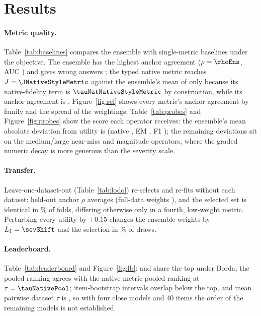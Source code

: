 \documentclass[10pt,twocolumn]{article}
\begin{document}
\section{Results}\label{sec:results}
\paragraph{Metric quality.} Table~\ref{tab:baselines} compares the ensemble with single-metric baselines under the objective. The ensemble has the highest anchor agreement ($\rho=\rhoEns$, AUC \aucEns) and gives wrong answers \badEns{}; the typed native metric reaches $J=\JNativeStyleMetric$ against the ensemble's mean of \JEnsembleTopHundred{} only because its native-fidelity term is $\tauNatNativeStyleMetric$ by construction, while its anchor agreement is \rhoNativeStyleMetric{}. Figure~\ref{fig:sel} shows every metric's anchor agreement by family and the spread of the \topK{} weightings; Table~\ref{tab:probes} and Figure~\ref{fig:probes} show the score each operator receives: the ensemble's mean absolute deviation from utility is \probeMaeEns{} (native \probeMaeNative, EM \probeMaeEm, F1 \probeMaeF); the remaining deviations sit on the medium/large near-miss and magnitude operators, where the graded numeric decay is more generous than the severity scale.
\paragraph{Transfer.} Leave-one-dataset-out (Table~\ref{tab:lodo}) re-selects and re-fits without each dataset: held-out anchor $\rho$ averages \lodoMeanLodo{} (full-data weights \lodoMeanFull), and the selected set is identical in \lodoSameSel\% of folds, differing otherwise only in a fourth, low-weight metric. Perturbing every utility by $\pm0.15$ changes the ensemble weights by $L_1=\sevShift$ and the selection in \sevSelChanged\% of draws.
\paragraph{Leaderboard.} Table~\ref{tab:leaderboard} and Figure~\ref{fig:lb}: \topOne{} and \topTwo{} share the top under Borda; the pooled ranking agrees with the native-metric pooled ranking at $\tau=\tauNativePool$; item-bootstrap intervals overlap below the top, and mean pairwise dataset $\tau$ is \pairTau{}, so with four close models and 40 items the order of the remaining models is not established.
\end{document}
